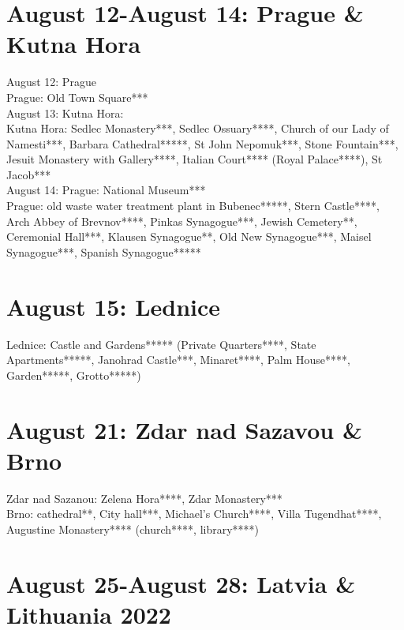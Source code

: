 \section{August 12-August 14:  Prague \& Kutna Hora}
\label{2022:Prague}

August 12: Prague\\

Prague: Old Town Square***\\

August 13: Kutna Hora:\\

Kutna Hora: Sedlec Monastery***, Sedlec Ossuary****, Church of our Lady of Namesti***, Barbara Cathedral*****, St John Nepomuk***,  Stone Fountain***, Jesuit Monastery with Gallery****, Italian Court**** (Royal Palace****), St Jacob***\\

August 14: Prague: National Museum***\\

Prague: old waste water treatment plant in Bubenec*****, Stern Castle****, Arch Abbey of Brevnov****, Pinkas Synagogue***, Jewish Cemetery**, Ceremonial Hall***, Klausen Synagogue**, Old New Synagogue***, Maisel Synagogue***,
Spanish Synagogue*****\\

\section{August 15:  Lednice}
\label{2022:Lednice}

Lednice: Castle and Gardens***** (Private Quarters****, State Apartments*****, Janohrad Castle***, Minaret****, Palm House****, Garden*****, Grotto*****)\\

\section{August 21:  Zdar nad Sazavou \& Brno}
\label{2022:zdarBrno}

Zdar nad Sazanou: Zelena Hora****, Zdar Monastery***\\
Brno: cathedral**, City hall***, Michael's Church****, Villa Tugendhat****, Augustine Monastery**** (church****, library****)\\

\section{August 25-August 28:  Latvia \& Lithuania 2022}
\label{2022:LatviaLithuania}

